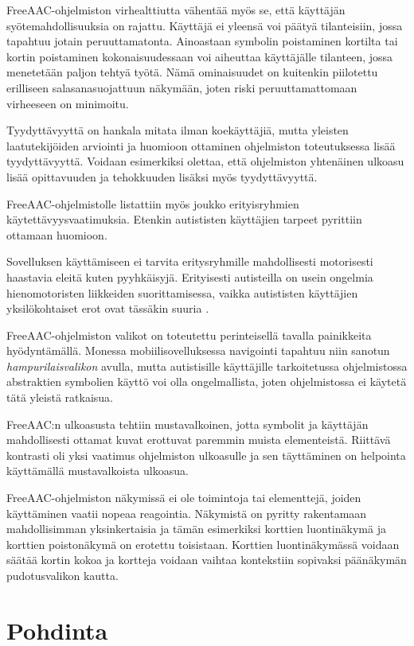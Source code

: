 \documentclass[utf8]{gradu3}
\begin{document}
FreeAAC-ohjelmiston virhealttiutta vähentää myös se, että käyttäjän syötemahdollisuuksia on rajattu. Käyttäjä ei yleensä voi päätyä tilanteisiin, jossa tapahtuu jotain peruuttamatonta. Ainoastaan symbolin poistaminen kortilta tai kortin poistaminen kokonaisuudessaan voi aiheuttaa käyttäjälle tilanteen, jossa menetetään paljon tehtyä työtä. Nämä ominaisuudet on kuitenkin piilotettu erilliseen salasanasuojattuun näkymään, joten riski peruuttamattomaan virheeseen on minimoitu.

Tyydyttävyyttä on hankala mitata ilman koekäyttäjiä, mutta yleisten laatutekijöiden arviointi ja huomioon ottaminen ohjelmiston toteutuksessa lisää tyydyttävyyttä. Voidaan esimerkiksi olettaa, että ohjelmiston yhtenäinen ulkoasu lisää opittavuuden ja tehokkuuden lisäksi myös tyydyttävyyttä.

FreeAAC-ohjelmistolle listattiin myös joukko erityisryhmien käytettävyysvaatimuksia. Etenkin autististen käyttäjien tarpeet pyrittiin ottamaan huomioon.

Sovelluksen käyttämiseen ei tarvita eritysryhmille mahdollisesti motorisesti haastavia eleitä kuten pyyhkäisyjä. Erityisesti autisteilla on usein ongelmia hienomotoristen liikkeiden suorittamisessa, vaikka autististen käyttäjien yksilökohtaiset erot ovat tässäkin suuria \parencite[]{motor-skills-autism}.

FreeAAC-ohjelmiston valikot on toteutettu perinteisellä tavalla painikkeita hyödyntämällä. Monessa mobiilisovelluksessa navigointi tapahtuu niin sanotun \textit{hampurilaisvalikon} avulla, mutta autistisille käyttäjille tarkoitetussa ohjelmistossa abstraktien symbolien käyttö voi olla ongelmallista, joten ohjelmistossa ei käytetä tätä yleistä ratkaisua.

FreeAAC:n ulkoasusta tehtiin mustavalkoinen, jotta symbolit ja käyttäjän mahdollisesti ottamat kuvat erottuvat paremmin muista elementeistä. Riittävä kontrasti oli yksi vaatimus ohjelmiston ulkoasulle ja sen täyttäminen on helpointa käyttämällä mustavalkoista ulkoasua.

FreeAAC-ohjelmiston näkymissä ei ole toimintoja tai elementtejä, joiden käyttäminen vaatii nopeaa reagointia. Näkymistä on pyritty rakentamaan mahdollisimman yksinkertaisia ja tämän esimerkiksi korttien luontinäkymä ja korttien poistonäkymä on erotettu toisistaan. Korttien luontinäkymässä voidaan säätää kortin kokoa ja kortteja voidaan vaihtaa kontekstiin sopivaksi päänäkymän pudotusvalikon kautta.

\chapter{Pohdinta}
\end{document}
